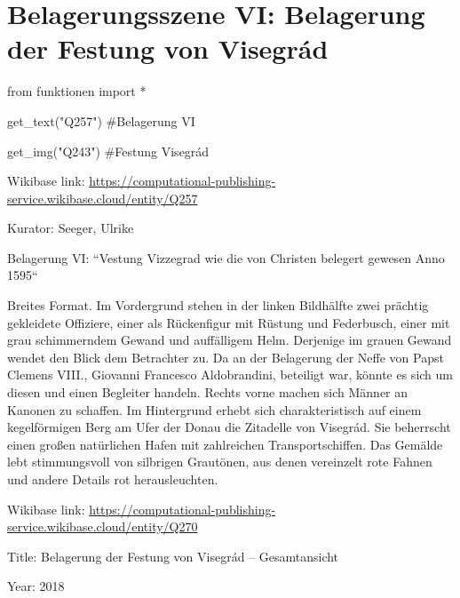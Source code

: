 \documentclass[
  a4paper,
  portrait]{book}
\newenvironment{Shaded}{\begin{snugshade}}{\end{snugshade}}
\newcommand{\CommentTok}[1]{\textcolor[rgb]{0.37,0.37,0.37}{#1}}
\newcommand{\ImportTok}[1]{\textcolor[rgb]{0.00,0.46,0.62}{#1}}
\newcommand{\NormalTok}[1]{\textcolor[rgb]{0.00,0.23,0.31}{#1}}
\newcommand{\OperatorTok}[1]{\textcolor[rgb]{0.37,0.37,0.37}{#1}}
\newcommand{\StringTok}[1]{\textcolor[rgb]{0.13,0.47,0.30}{#1}}
\begin{document}
\chapter{Belagerungsszene VI: Belagerung der Festung von
Visegrád}\label{belagerungsszene-vi-belagerung-der-festung-von-visegruxe1d}

\begin{Shaded}
\begin{Highlighting}[]
\ImportTok{from}\NormalTok{ funktionen }\ImportTok{import} \OperatorTok{*}
\end{Highlighting}
\end{Shaded}

\begin{Shaded}
\begin{Highlighting}[]
\NormalTok{get\_text(}\StringTok{"Q257"}\NormalTok{)}
\CommentTok{\#Belagerung VI}

\NormalTok{get\_img(}\StringTok{"Q243"}\NormalTok{)}
\CommentTok{\#Festung Visegrád}
\end{Highlighting}
\end{Shaded}

Wikibase link:
\url{https://computational-publishing-service.wikibase.cloud/entity/Q257}

Kurator: Seeger, Ulrike

Belagerung VI: ``Vestung Vizzegrad wie die von Christen belegert gewesen
Anno 1595``

Breites Format. Im Vordergrund stehen in der linken Bildhälfte zwei
prächtig gekleidete Offiziere, einer als Rückenfigur mit Rüstung und
Federbusch, einer mit grau schimmerndem Gewand und auffälligem Helm.
Derjenige im grauen Gewand wendet den Blick dem Betrachter zu. Da an der
Belagerung der Neffe von Papst Clemens VIII., Giovanni Francesco
Aldobrandini, beteiligt war, könnte es sich um diesen und einen
Begleiter handeln. Rechts vorne machen sich Männer an Kanonen zu
schaffen. Im Hintergrund erhebt sich charakteristisch auf einem
kegelförmigen Berg am Ufer der Donau die Zitadelle von Visegrád. Sie
beherrscht einen großen natürlichen Hafen mit zahlreichen
Transportschiffen. Das Gemälde lebt stimmungsvoll von silbrigen
Grautönen, aus denen vereinzelt rote Fahnen und andere Details rot
herausleuchten.

Wikibase link:
\url{https://computational-publishing-service.wikibase.cloud/entity/Q270}

Title: Belagerung der Festung von Visegrád -- Gesamtansicht

Year: 2018
\end{document}
